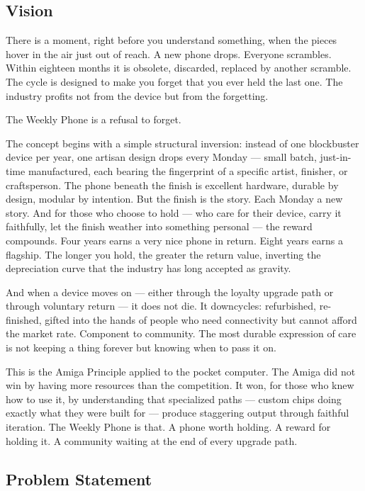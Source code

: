 \documentclass[11pt,letterpaper]{article}
\begin{document}
\subsection{Vision}

There is a moment, right before you understand something, when the pieces hover in the air just out of reach. A new phone drops. Everyone scrambles. Within eighteen months it is obsolete, discarded, replaced by another scramble. The cycle is designed to make you forget that you ever held the last one. The industry profits not from the device but from the forgetting.

The Weekly Phone is a refusal to forget.

The concept begins with a simple structural inversion: instead of one blockbuster device per year, one artisan design drops every Monday --- small batch, just-in-time manufactured, each bearing the fingerprint of a specific artist, finisher, or craftsperson. The phone beneath the finish is excellent hardware, durable by design, modular by intention. But the finish is the story. Each Monday a new story. And for those who choose to hold --- who care for their device, carry it faithfully, let the finish weather into something personal --- the reward compounds. Four years earns a very nice phone in return. Eight years earns a flagship. The longer you hold, the greater the return value, inverting the depreciation curve that the industry has long accepted as gravity.

And when a device moves on --- either through the loyalty upgrade path or through voluntary return --- it does not die. It downcycles: refurbished, re-finished, gifted into the hands of people who need connectivity but cannot afford the market rate. Component to community. The most durable expression of care is not keeping a thing forever but knowing when to pass it on.

This is the Amiga Principle applied to the pocket computer. The Amiga did not win by having more resources than the competition. It won, for those who knew how to use it, by understanding that specialized paths --- custom chips doing exactly what they were built for --- produce staggering output through faithful iteration. The Weekly Phone is that. A phone worth holding. A reward for holding it. A community waiting at the end of every upgrade path.

\subsection{Problem Statement}
\end{document}
